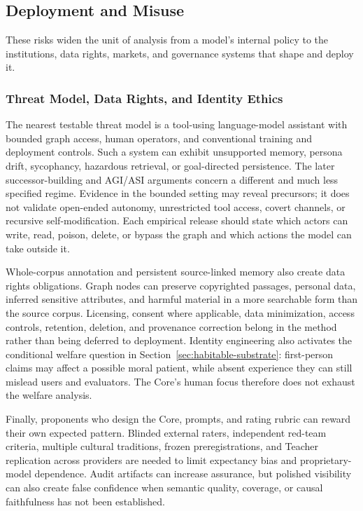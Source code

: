 \subsection{Deployment and Misuse}

These risks widen the unit of analysis from a model's internal policy to the
institutions, data rights, markets, and governance systems that shape and
deploy it.

\subsubsection{Threat Model, Data Rights, and Identity Ethics}

The nearest testable threat model is a tool-using language-model assistant with
bounded graph access, human operators, and conventional training and deployment
controls. Such a system can exhibit unsupported memory, persona drift,
sycophancy, hazardous retrieval, or goal-directed persistence. The later
successor-building and AGI/ASI arguments concern a different and much less
specified regime. Evidence in the bounded setting may reveal precursors; it
does not validate open-ended autonomy, unrestricted tool access, covert
channels, or recursive self-modification. Each empirical release should state
which actors can write, read, poison, delete, or bypass the graph and which
actions the model can take outside it.

Whole-corpus annotation and persistent source-linked memory also create data
rights obligations. Graph nodes can preserve copyrighted passages, personal
data, inferred sensitive attributes, and harmful material in a more searchable
form than the source corpus. Licensing, consent where applicable, data
minimization, access controls, retention, deletion, and provenance correction
belong in the method rather than being deferred to deployment. Identity
engineering also activates the conditional welfare question in
Section~\ref{sec:habitable-substrate}: first-person claims may affect a possible
moral patient, while absent experience they can still mislead users and
evaluators. The Core's human focus therefore does not exhaust the welfare
analysis.

Finally, proponents who design the Core, prompts, and rating rubric can reward
their own expected pattern. Blinded external raters, independent red-team
criteria, multiple cultural traditions, frozen preregistrations, and Teacher
replication across providers are needed to limit expectancy bias and
proprietary-model dependence. Audit artifacts can increase assurance, but
polished visibility can also create false confidence when semantic quality,
coverage, or causal faithfulness has not been established.

